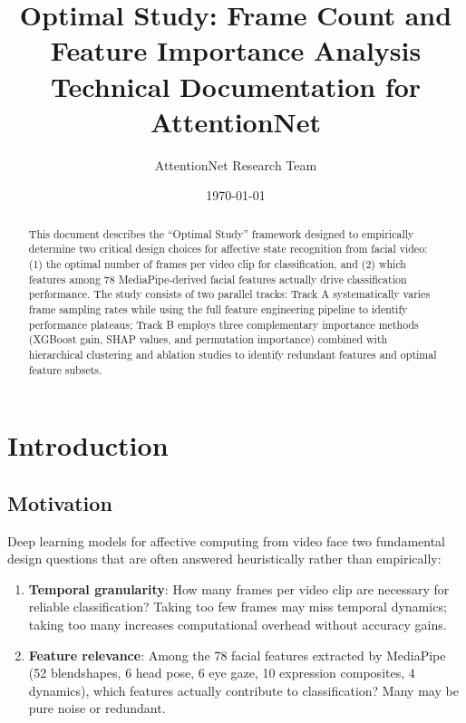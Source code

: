 \documentclass[11pt,a4paper]{article}
\title{\textbf{Optimal Study: Frame Count and Feature Importance Analysis}\\\large Technical Documentation for AttentionNet}
\author{AttentionNet Research Team}
\date{\today}
\begin{document}
\maketitle

\begin{abstract}
\noindent
This document describes the ``Optimal Study'' framework designed to empirically determine two critical design choices for affective state recognition from facial video: (1) the optimal number of frames per video clip for classification, and (2) which features among 78 MediaPipe-derived facial features actually drive classification performance. The study consists of two parallel tracks: Track A systematically varies frame sampling rates while using the full feature engineering pipeline to identify performance plateaus; Track B employs three complementary importance methods (XGBoost gain, SHAP values, and permutation importance) combined with hierarchical clustering and ablation studies to identify redundant features and optimal feature subsets.
\end{abstract}

\section{Introduction}\label{sec:introduction}

\subsection{Motivation}

Deep learning models for affective computing from video face two fundamental design questions that are often answered heuristically rather than empirically:

\begin{enumerate}
    \item \textbf{Temporal granularity}: How many frames per video clip are necessary for reliable classification? Taking too few frames may miss temporal dynamics; taking too many increases computational overhead without accuracy gains.
    
    \item \textbf{Feature relevance}: Among the 78 facial features extracted by MediaPipe (52 blendshapes, 6 head pose, 6 eye gaze, 10 expression composites, 4 dynamics), which features actually contribute to classification? Many may be pure noise or redundant.
\end{enumerate}
\end{document}
